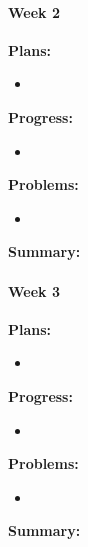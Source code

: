 \paragraph{Week 2}
\begin{adjustwidth}{2.5em}{0pt}
    \vspace{-0.5cm}\textbf{Plans:}
    \vspace{-0.5cm}
    \begin{itemize}
        \item  
    \end{itemize} 
    \vspace{-0.3cm}\textbf{Progress:}
    \vspace{-0.5cm}
    \begin{itemize}
        \item 
    \end{itemize} 
    \vspace{-0.3cm}\textbf{Problems:}
    \vspace{-0.5cm}
    \begin{itemize}
        \item 
    \end{itemize}  
    \vspace{-0.3cm}\noindent\textbf{Summary:}\\
    \noindent
\end{adjustwidth} 

\paragraph{Week 3}
\begin{adjustwidth}{2.5em}{0pt}
    \vspace{-0.5cm}\textbf{Plans:}
    \vspace{-0.5cm}
    \begin{itemize}
        \item 
    \end{itemize} 
    \vspace{-0.3cm}\textbf{Progress:}
    \vspace{-0.5cm}
    \begin{itemize}
        \item  
    \end{itemize} 
    \vspace{-0.3cm}\textbf{Problems:}
    \vspace{-0.5cm}
    \begin{itemize}
        \item 
    \end{itemize}  
    \vspace{-0.3cm}\noindent\textbf{Summary:}\\
    \noindent 
\end{adjustwidth} 

